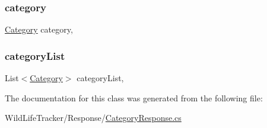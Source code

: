 \subsubsection{\texorpdfstring{category}{category}}
{\footnotesize\ttfamily \hyperlink{classWildLifeTracker_1_1Models_1_1Category}{Category} category\hspace{0.3cm}{\ttfamily [get]}, {\ttfamily [set]}}

\mbox{\label{classWildLifeTracker_1_1Response_1_1CategoryResponse_ac20f04846190de6a34eadd21501afae3}} 
\subsubsection{\texorpdfstring{category\+List}{categoryList}}
{\footnotesize\ttfamily List$<$\hyperlink{classWildLifeTracker_1_1Models_1_1Category}{Category}$>$ category\+List\hspace{0.3cm}{\ttfamily [get]}, {\ttfamily [set]}}



The documentation for this class was generated from the following file\+:\begin{DoxyCompactItemize}
\item 
Wild\+Life\+Tracker/\+Response/\hyperlink{CategoryResponse_8cs}{Category\+Response.\+cs}\end{DoxyCompactItemize}
